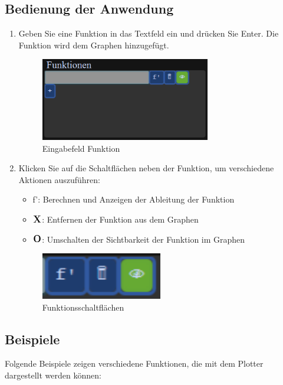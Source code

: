 \documentclass[a4paper]{article}
\begin{document}
\subsection{Bedienung der Anwendung}
\begin{enumerate}
	\item Geben Sie eine Funktion in das Textfeld ein und drücken Sie Enter. Die Funktion wird dem Graphen hinzugefügt.
	      \begin{figure}[ht]
		      \centering
		      \includegraphics[width=0.7\textwidth]{Resources/example_function.png}
		      \caption{Eingabefeld Funktion}
		      \label{fig:example_function}
	      \end{figure}
	      \newpage
	\item Klicken Sie auf die Schaltflächen neben der Funktion, um verschiedene Aktionen auszuführen:
	      \begin{itemize}
		      \item f': Berechnen und Anzeigen der Ableitung der Funktion
		      \item \(\mathrm{\large{\textbf{X}}}\): Entfernen der Funktion aus dem Graphen
		      \item \(\mathrm{\large{\textbf{O}}}\): Umschalten der Sichtbarkeit der Funktion im Graphen
	      \end{itemize}
	      \begin{figure}[ht]
		      \centering
		      \includegraphics[width=0.5\textwidth]{Resources/example_buttons.png}
		      \caption{Funktionsschaltflächen}
		      \label{fig:example_buttons}
	      \end{figure}
\end{enumerate}

\subsection{Beispiele}
Folgende Beispiele zeigen verschiedene Funktionen, die mit dem Plotter dargestellt werden können:
\end{document}
